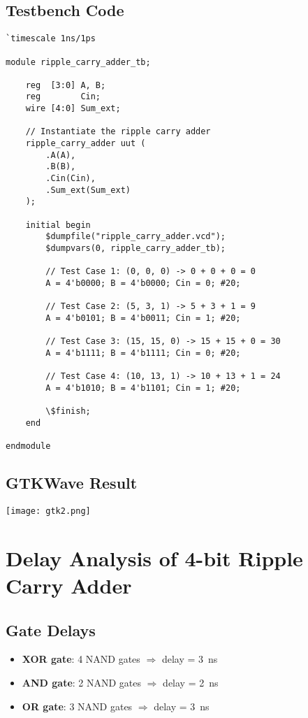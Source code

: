 \documentclass{article}
\begin{document}
\subsection*{Testbench Code}

\begin{verbatim}
`timescale 1ns/1ps

module ripple_carry_adder_tb;

    reg  [3:0] A, B;
    reg        Cin;
    wire [4:0] Sum_ext;

    // Instantiate the ripple carry adder
    ripple_carry_adder uut (
        .A(A),
        .B(B),
        .Cin(Cin),
        .Sum_ext(Sum_ext)
    );

    initial begin
        $dumpfile("ripple_carry_adder.vcd");
        $dumpvars(0, ripple_carry_adder_tb);

        // Test Case 1: (0, 0, 0) -> 0 + 0 + 0 = 0
        A = 4'b0000; B = 4'b0000; Cin = 0; #20;

        // Test Case 2: (5, 3, 1) -> 5 + 3 + 1 = 9
        A = 4'b0101; B = 4'b0011; Cin = 1; #20;

        // Test Case 3: (15, 15, 0) -> 15 + 15 + 0 = 30
        A = 4'b1111; B = 4'b1111; Cin = 0; #20;

        // Test Case 4: (10, 13, 1) -> 10 + 13 + 1 = 24
        A = 4'b1010; B = 4'b1101; Cin = 1; #20;

        \$finish;
    end

endmodule
\end{verbatim}

\subsection*{GTKWave Result}
\vspace{4cm} %
\begin{center}
    \texttt{[image: gtk2.png]}
\end{center}
\newpage

\section*{Delay Analysis of 4-bit Ripple Carry Adder}

\subsection*{Gate Delays}
\begin{itemize}
  \item \textbf{XOR gate}: 4 NAND gates $\Rightarrow$ delay = \SI{3}{\nano\second}
  \item \textbf{AND gate}: 2 NAND gates $\Rightarrow$ delay = \SI{2}{\nano\second}
  \item \textbf{OR gate}: 3 NAND gates $\Rightarrow$ delay = \SI{3}{\nano\second}
\end{itemize}
\end{document}
